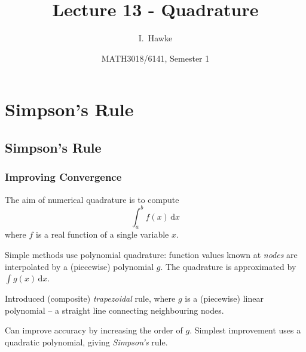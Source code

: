 \documentclass{beamer}
\title[Lecture 13] %
{Lecture 13 - Quadrature}
\author[I. Hawke] %
{I.~Hawke}
\institute[University of Southampton] %
{
  School of Mathematics, \\
  University of Southampton, UK
}
\date[Semester 1] %
{MATH3018/6141, Semester 1}
\begin{document}
\begin{frame}
  \titlepage
\end{frame}

\section{Simpson's Rule}

\subsection{Simpson's Rule}

\begin{frame}
  \frametitle{Improving Convergence}

  The aim of numerical quadrature is to compute
  \begin{equation*}
    \int_a^b f(x) \, \text{d}x
  \end{equation*}
  where $f$ is a real function of a single variable $x$.

  \vspace{1ex}

  Simple methods use polynomial quadrature: function values known
  at \emph{nodes} are interpolated by a (piecewise) polynomial $g$. The
  quadrature is approximated by $\int g(x) \, \text{d}x$. \pause

  \vspace{1ex}

  Introduced (composite) \emph{trapezoidal} rule, where $g$ is a
  (piecewise) linear polynomial -- a straight line connecting
  neighbouring nodes. \pause

  \vspace{1ex}

  Can improve accuracy by increasing the order of $g$.  Simplest
  improvement uses a quadratic polynomial, giving \emph{Simpson's}
  rule.

\end{frame}
\end{document}
